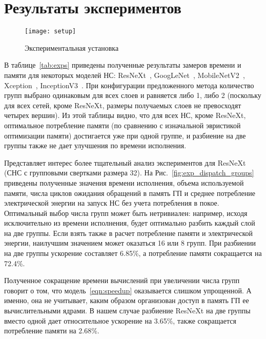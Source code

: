 
\section{Результаты экспериментов}\label{sec:exp}

\begin{figure}
\centering
\texttt{[image: setup]}
\caption{Экспериментальная установка}
\label{fig:setup}
\end{figure}

В таблице~\ref{tab:exps} приведены полученные результаты замеров времени и
памяти для некоторых моделей НС: ResNeXt~\cite{resnext},
GoogLeNet~\cite{googlenet}, MobileNetV2~\cite{mobilenetv2},
Xception~\cite{xception}, InceptionV3~\cite{inceptionv3}. При конфигурации
предложенного метода количество групп выбрано одинаковым для всех слоев и
равняется либо 1, либо 2 (поскольку для всех сетей, кроме ResNeXt, размеры
получаемых слоев не превосходят четырех вершин). Из этой таблицы видно, что для
всех НС, кроме ResNeXt, оптимальное потребление памяти (по сравнению с
изначальной эвристикой оптимизации памяти) достигается уже при одной группе, и
разбиение на две группы также не дает улучшения по времени исполнения.

Представляет интерес более тщательный анализ экспериментов для ResNeXt (СНС с
групповыми свертками размера 32). На Рис.~\ref{fig:exp_dispatch_groups}
приведены полученные значения времени исполнения, объема используемой памяти,
числа циклов ожидания обращений в память ГП и среднее потребление электрической
энергии на запуск НС без учета потребления в покое. Оптимальный выбор числа
групп может быть нетривиален: например, исходя исключительно из времени
исполнения, будет оптимально разбить каждый слой на две группы. Если взять также
в расчет потребление памяти и электрической энергии, наилучшим значением может
оказаться 16 или 8 групп. При разбиении на две группы ускорение составляет
6.85\%, а потребление памяти сокращается на 72.4\%.

Полученное сокращение времени вычислений при увеличении числа групп говорит о
том, что модель~\ref{eqn:speedup} оказывается слишком упрощенной. А именно, она
не учитывает, каким образом организован доступ в память ГП ее вычислительными
ядрами. В нашем случае разбиение ResNeXt на две группы вместо одной дает
относительное ускорение на 3.65\%, также сокращается потребление памяти на
2.68\%.

